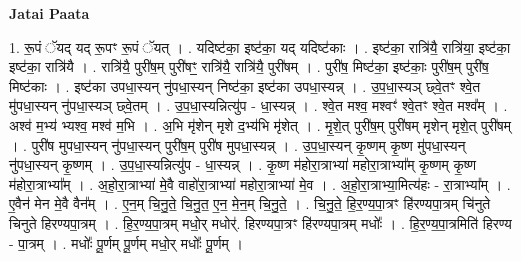 \documentclass[17pt]{extarticle}
\begin{document}
\textbf{Jatai Paata} \newline

1. रू॒पं ॅयद् यद् रू॒पꣳ रू॒पं ॅयत् । . यदिष्ट॑का॒ इष्ट॑का॒ यद् यदिष्ट॑काः । . इष्ट॑का॒ रात्रि॑यै॒ रात्रि॑या॒ इष्ट॑का॒ इष्ट॑का॒ रात्रि॑यै । . रात्रि॑यै॒ पुरी॑ष॒म् पुरी॑षꣳ॒॒ रात्रि॑यै॒ रात्रि॑यै॒ पुरी॑षम् । . पुरी॑ष॒ मिष्ट॑का॒ इष्ट॑काः॒ पुरी॑ष॒म् पुरी॑ष॒ मिष्ट॑काः । . इष्ट॑का उपधा॒स्यन् नु॑पधा॒स्यन् निष्ट॑का॒ इष्ट॑का उपधा॒स्यन्न् । . उ॒प॒धा॒स्यञ् छ्वे॒तꣳ श्वे॒त मु॑पधा॒स्यन् नु॑पधा॒स्यञ् छ्वे॒तम् । . उ॒प॒धा॒स्यन्नित्यु॑प - धा॒स्यन्न् । . श्वे॒त मश्व॒ मश्वꣳ॑ श्वे॒तꣳ श्वे॒त मश्व᳚म् । . अश्व॑ म॒भ्य॑ भ्यश्व॒ मश्व॑ म॒भि । . अ॒भि मृ॑शेन् मृशे द॒भ्य॑भि मृ॑शेत् । . मृ॒शे॒त् पुरी॑ष॒म् पुरी॑षम् मृशेन् मृशे॒त् पुरी॑षम् । . पुरी॑ष मुपधा॒स्यन् नु॑पधा॒स्यन् पुरी॑ष॒म् पुरी॑ष मुपधा॒स्यन्न् । . उ॒प॒धा॒स्यन् कृ॒ष्णम् कृ॒ष्ण मु॑पधा॒स्यन् नु॑पधा॒स्यन् कृ॒ष्णम् । . उ॒प॒धा॒स्यन्नित्यु॑प - धा॒स्यन्न् । . कृ॒ष्ण म॑होरा॒त्राभ्या॑ महोरा॒त्राभ्या᳚म् कृ॒ष्णम् कृ॒ष्ण म॑होरा॒त्राभ्या᳚म् । . अ॒हो॒रा॒त्राभ्या॑ मे॒वै वाहो॑रा॒त्राभ्या॑ महोरा॒त्राभ्या॑ मे॒व । . अ॒हो॒रा॒त्राभ्या॒मित्य॑हः - रा॒त्राभ्या᳚म् । . ए॒वैन॑ मेन मे॒वै वैन᳚म् । . ए॒न॒म् चि॒नु॒ते॒ चि॒नु॒त॒ ए॒न॒ मे॒न॒म् चि॒नु॒ते॒ । . चि॒नु॒ते॒ हि॒र॒ण्य॒पा॒त्रꣳ हि॑रण्यपा॒त्रम् चि॑नुते चिनुते हिरण्यपा॒त्रम् । . हि॒र॒ण्य॒पा॒त्रम् मधो॒र् मधोर्॑. हिरण्यपा॒त्रꣳ हि॑रण्यपा॒त्रम् मधोः᳚ । . हि॒र॒ण्य॒पा॒त्रमिति॑ हिरण्य - पा॒त्रम् । . मधोः᳚ पू॒र्णम् पू॒र्णम् मधो॒र् मधोः᳚ पू॒र्णम् । \newline
\end{document}
